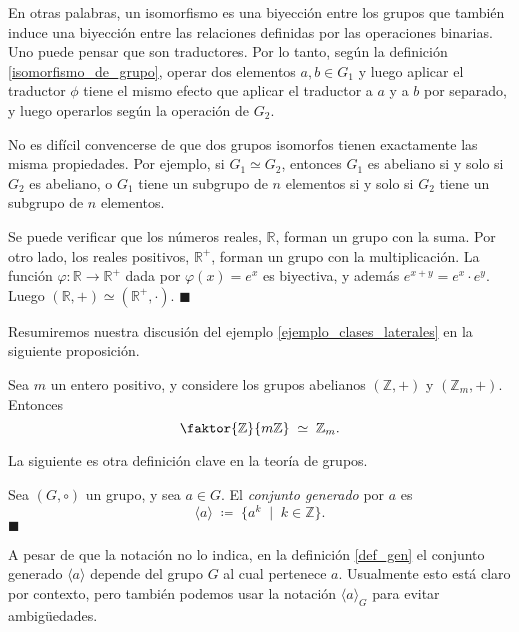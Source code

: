 En otras palabras, un isomorfismo es una biyección entre los grupos que también induce una biyección entre las relaciones definidas por las operaciones binarias. Uno puede pensar que son traductores. Por lo tanto, según la definición \ref{isomorfismo_de_grupo}, operar dos elementos $a, b \in G_1$ y luego aplicar el traductor $\phi$ tiene el mismo efecto que aplicar el traductor a $a$ y a $b$ por separado, y luego operarlos según la operación de $G_2$.

No es difícil convencerse de que dos grupos isomorfos tienen exactamente las misma propiedades. Por ejemplo, si $G_1 \simeq G_2$, entonces $G_1$ es abeliano si y solo si $G_2$ es abeliano, o $G_1$ tiene un subgrupo de $n$ elementos si y solo si $G_2$ tiene un subgrupo de $n$ elementos.


\begin{example} \label{ejemplo_exponencial}
Se puede verificar que los números reales, $\mathbb{R}$, forman un grupo con la suma. Por otro lado, los reales positivos, $\mathbb{R}^{+}$, forman un grupo con la multiplicación. La función $\varphi\colon \mathbb{R} \rightarrow \mathbb{R}^{+}$ dada por $\varphi(x) = e^x$ es biyectiva, y además $e^{x+y} = e^x \cdot e^y$. Luego $(\mathbb{R}, +) \simeq (\mathbb{R}^{+}, \cdot)$. \hfill$\blacksquare$
\end{example}

Resumiremos nuestra discusión del ejemplo \ref{ejemplo_clases_laterales} en la siguiente proposición.

\begin{prop}
Sea $m$ un entero positivo, y considere los grupos abelianos $(\mathbb{Z}, +)$ y $(\mathbb{Z}_m, +)$. Entonces $$\faktor{\mathbb{Z}}{m \mathbb{Z}} \; \simeq \; \mathbb{Z}_m.$$
\end{prop}


La siguiente es otra definición clave en la teoría de grupos.
 
\begin{definition}\label{def_gen}
	Sea $(G,\circ)$ un grupo, y sea $a \in G$.
	El \emph{conjunto generado} por $a$ es
	$$\langle a \rangle \; \coloneq \; \{a^k\; \mid \; k\in\mathbb{Z}\}.$$
    \hfill$\blacksquare$
\end{definition}

A pesar de que la notación no lo indica, en la definición \ref{def_gen} el conjunto generado $\langle a \rangle$ depende del grupo $G$ al cual pertenece $a$. Usualmente esto está claro por contexto, pero también podemos usar la notación $\langle a \rangle_{G}$ para evitar ambigüedades.


